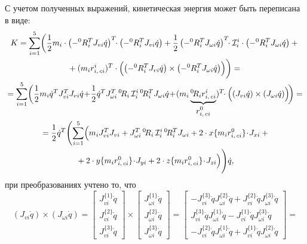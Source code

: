 С учетом полученных выражений, кинетическая энергия может быть переписана в виде:
\begin{gather}
	K = \sum_{i=1}^5 \biggl( \frac{1}{2} m_i \cdot \left( -{}^0R_i^T J_{vi} \dot{q} \right)^T \!\!\cdot \left(-{}^0R_i^T J_{vi} \dot{q}\right) + \frac{1}{2} \left( -{}^0R_i^T J_{\omega i} \dot{q} \right)^T \!\!\cdot \mathcal{I}^{i}_i \cdot \left( -{}^0R_i^T J_{\omega i} \dot{q} \right) + {}\notag\\
	{} + (m_ir^i_{i,\,ci})^T \cdot \Bigl( \left( -{}^0R_i^T J_{vi} \dot{q} \right) \times \left( -{}^0R_i^T J_{\omega i} \dot{q} \right) \Bigr) \biggr) = {}\notag\\
	{} = \sum_{i=1}^5 \biggl(\frac{1}{2} m_i \dot{q}^T J_{vi}^T J_{vi} \dot{q} \!+\! \frac{1}{2} \dot{q}^T J_{\omega i}^T \, {}^0\!R_i \, \mathcal{I}^{i}_i \, {}^0\!R_i^T J_{\omega i} \dot{q} \!+\! (m_i \underbrace{{}^0\!R_i r^i_{i,\,ci}}_{\displaystyle r^0_{i,\,ci}})^T \!\!\cdot \Bigl( \left( J_{vi} \dot{q} \right) \times \left( J_{\omega i} \dot{q} \right) \Bigr) \!\biggr) = {}\notag \\
	{} = \frac{1}{2} \dot{q}^T \Biggl(\sum_{i=1}^5 \Bigl(m_i J_{vi}^T J_{vi} + J_{\omega i}^T \, {}^0\!R_i \, \mathcal{I}^{i}_i \, {}^0\!R_i^T J_{\omega i} + 2 \cdot x\{ m_i r^0_{i,\,ci} \} \!\cdot\! J_{xi}  + {}\notag \\
	{} + 2 \cdot y\{ m_i r^0_{i,\,ci} \} \!\cdot\! J_{yi} + 2 \cdot z\{ m_i r^0_{i,\,ci} \} \!\cdot\! J_{zi}\Bigr) \Biggr) \dot{q}, \label{eq_getting_form_with_D_for_K}
\end{gather}
при преобразованиях учтено то, что
\begin{equation*}
\left( J_{vi} \dot{q} \right) \times \left( J_{\omega i} \dot{q} \right) =
\begin{bmatrix}
J_{vi}^{\{1\}} \dot{q}\\
J_{vi}^{\{2\}} \dot{q}\\
J_{vi}^{\{3\}} \dot{q}
\end{bmatrix}
\times
\begin{bmatrix}
J_{\omega i}^{\{1\}} \dot{q}\\
J_{\omega i}^{\{2\}} \dot{q}\\
J_{\omega i}^{\{3\}} \dot{q}
\end{bmatrix}
=
\begin{bmatrix}
-J_{vi}^{\{3\}} \dot{q} J_{\omega i}^{\{2\}} \dot{q} + J_{vi}^{\{2\}} \dot{q} J_{\omega i}^{\{3\}} \dot{q}\\
J_{vi}^{\{3\}} \dot{q} J_{\omega i}^{\{1\}} \dot{q} - J_{vi}^{\{1\}} \dot{q} J_{\omega i}^{\{3\}} \dot{q}\\
-J_{vi}^{\{2\}} \dot{q} J_{\omega i}^{\{1\}} \dot{q} + J_{vi}^{\{1\}} \dot{q} J_{\omega i}^{\{2\}} \dot{q}
\end{bmatrix}
=
\end{equation*}

